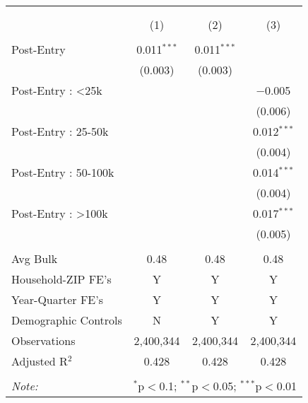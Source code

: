
\begin{table}[!htbp] \centering 
  \caption{} 
  \label{} 
\begin{tabular}{@{\extracolsep{5pt}}lccc} 
\\[-1.8ex]\hline 
\hline \\[-1.8ex] 
\\[-1.8ex] & (1) & (2) & (3)\\ 
\hline \\[-1.8ex] 
 Post-Entry & 0.011$^{***}$ & 0.011$^{***}$ &  \\ 
  & (0.003) & (0.003) &  \\ 
  Post-Entry : <25k &  &  & $-$0.005 \\ 
  &  &  & (0.006) \\ 
  Post-Entry : 25-50k &  &  & 0.012$^{***}$ \\ 
  &  &  & (0.004) \\ 
  Post-Entry : 50-100k &  &  & 0.014$^{***}$ \\ 
  &  &  & (0.004) \\ 
  Post-Entry : >100k &  &  & 0.017$^{***}$ \\ 
  &  &  & (0.005) \\ 
 \hline \\[-1.8ex] 
Avg Bulk & 0.48 & 0.48 & 0.48 \\ 
Household-ZIP FE's & Y & Y & Y \\ 
Year-Quarter FE's & Y & Y & Y \\ 
Demographic Controls & N & Y & Y \\ 
Observations & 2,400,344 & 2,400,344 & 2,400,344 \\ 
Adjusted R$^{2}$ & 0.428 & 0.428 & 0.428 \\ 
\hline 
\hline \\[-1.8ex] 
\textit{Note:}  & \multicolumn{3}{l}{$^{*}$p$<$0.1; $^{**}$p$<$0.05; $^{***}$p$<$0.01} \\ 
\end{tabular} 
\end{table} 
